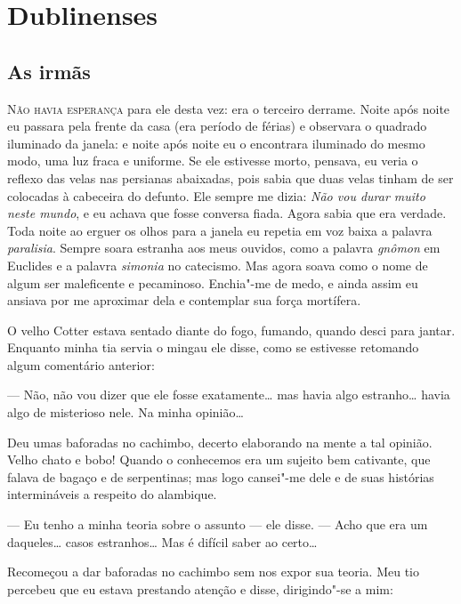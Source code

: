\part{Dublinenses}


\chapter{As irmãs}


\textsc{Não havia esperança} para ele desta vez: era o terceiro derrame.  Noite
após noite eu passara pela frente da casa (era período de férias) e observara o
quadrado iluminado da janela: e noite após noite eu o encontrara iluminado do
mesmo modo, uma luz fraca e uniforme.  Se ele estivesse morto, pensava, eu
veria o reflexo das velas nas persianas abaixadas, pois sabia que duas velas
tinham de ser colocadas à cabeceira do defunto.  Ele sempre me dizia:
\textit{Não vou durar muito neste mundo}, e eu achava que fosse conversa fiada.
Agora sabia que era verdade.  Toda noite ao erguer os olhos para a janela eu
repetia em voz baixa a palavra \textit{paralisia}.  Sempre soara estranha aos
meus ouvidos, como a palavra \textit{gnômon} em Euclides e a palavra
\textit{simonia} no catecismo.  Mas agora soava como o nome de algum ser
maleficente e pecaminoso.  Enchia"-me de medo, e ainda assim eu ansiava por me
aproximar dela e contemplar sua força mortífera.

O velho Cotter estava sentado diante do fogo, fumando, quando desci para
jantar.  Enquanto minha tia servia o mingau ele disse, como se estivesse
retomando algum comentário anterior:

--- Não, não vou dizer que ele fosse exatamente\ldots{} mas havia algo
estranho\ldots{} havia algo de misterioso nele.  Na minha opinião\ldots{}

Deu umas baforadas no cachimbo, decerto elaborando na mente a tal opinião.
Velho chato e bobo! Quando o conhecemos era um sujeito bem cativante, que
falava de bagaço e de serpentinas; mas logo cansei"-me dele e de suas histórias
intermináveis a respeito do alambique.

--- Eu tenho a minha teoria sobre o assunto --- ele disse.  --- Acho que era um
daqueles\ldots{} casos estranhos\ldots{} Mas é difícil saber ao certo\ldots{}

Recomeçou a dar baforadas no cachimbo sem nos expor sua teoria.  Meu tio
percebeu que eu estava prestando atenção e disse, dirigindo"-se a mim:

